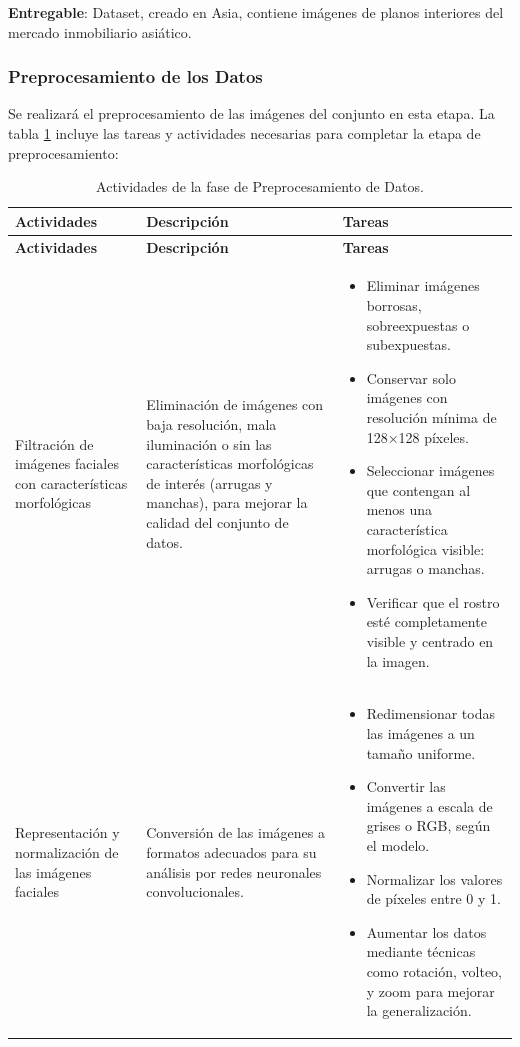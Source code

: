 \textbf{Entregable}: Dataset, creado en Asia, contiene imágenes de planos interiores del mercado inmobiliario asiático.


\subsubsection{Preprocesamiento de los Datos}
Se realizará el preprocesamiento de las imágenes del conjunto en esta etapa. La tabla \ref{tabla:preprocesamiento} incluye las tareas y actividades necesarias para completar la etapa de preprocesamiento:
\vspace{2ex}


\begin{longtable}{p{3cm}p{3cm}p{9cm}}
    \caption{Actividades de la fase de Preprocesamiento de Datos.}
    \label{tabla:preprocesamiento}\\
    \toprule
    \textbf{Actividades} & \textbf{Descripción} & \textbf{Tareas} \\
    \midrule
    \endfirsthead

    \toprule
    \textbf{Actividades} & \textbf{Descripción} & \textbf{Tareas} \\
    \midrule
    \endhead

    \bottomrule
    \endfoot

    \bottomrule
    \endlastfoot

    Filtración de imágenes faciales con características morfológicas & Eliminación de imágenes con baja resolución, mala iluminación o sin las características morfológicas de interés (arrugas y manchas), para mejorar la calidad del conjunto de datos. & 
    \begin{itemize}
        \item Eliminar imágenes borrosas, sobreexpuestas o subexpuestas.
        \item Conservar solo imágenes con resolución mínima de 128×128 píxeles.
        \item Seleccionar imágenes que contengan al menos una característica morfológica visible: arrugas o manchas.
        \item Verificar que el rostro esté completamente visible y centrado en la imagen.
    \end{itemize} \\

    Representación y normalización de las imágenes faciales & Conversión de las imágenes a formatos adecuados para su análisis por redes neuronales convolucionales. & 
    \begin{itemize}
        \item Redimensionar todas las imágenes a un tamaño uniforme.
        \item Convertir las imágenes a escala de grises o RGB, según el modelo.
        \item Normalizar los valores de píxeles entre 0 y 1.
        \item Aumentar los datos mediante técnicas como rotación, volteo, y zoom para mejorar la generalización.
    \end{itemize} \\

\end{longtable}

